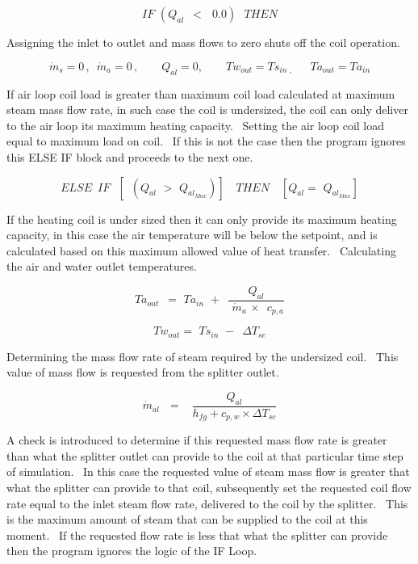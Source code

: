 \begin{equation}
IF\,\,({Q_{al}}\,\,\, < \,\,\,\,0.0)\,\,\,\,THEN
\end{equation}

Assigning the inlet to outlet and mass flows to zero shuts off the coil operation.

\begin{equation}
{\dot m_s} = 0\,,\,\,\,{\dot m_a} = 0\,,\,\,\,\,\,\,\,\,\,\,\,\,{Q_{al}} = 0,\,\,\,\,\,\,\,\,\,\,\,\,T{w_{out}} = T{s_{in\,\,,\,\,\,\,}}\,\,\,\,\,\,T{a_{out}} = T{a_{in}}
\end{equation}

If air loop coil load is greater than maximum coil load calculated at maximum steam mass flow rate, in such case the coil is undersized, the coil can only deliver to the air loop its maximum heating capacity.~ Setting the air loop coil load equal to maximum load on coil.~ If this is not the case then the program ignores this ELSE IF block and proceeds to the next one.

\begin{equation}
ELSE\,\,\,IF\,\,\,\,\left[ {\,\,\,({Q_{al}}\,\, > \,\,{Q_{a{l_{Max}}}})} \right]\,\,\,\,\,\,THEN\,\,\,\,\,\,\left[ {{Q_{al}} = \,\,{Q_{a{l_{Max}}}}} \right]
\end{equation}

If the heating coil is under sized then it can only provide its maximum heating capacity, in this case the air temperature will be below the setpoint, and is calculated based on this maximum allowed value of heat transfer.~ Calculating the air and water outlet temperatures.

\begin{equation}
T{a_{out}}\,\,\, = \,\,T{a_{in}}\,\, + \,\,\,\frac{{{Q_{al}}}}{{\,\,{{\dot m}_a}\, \times \,\,\,{c_{p,a}}}}
\end{equation}

\begin{equation}
T{w_{out}} = \,\,T{s_{in}}\,\, - \,\,\,\Delta {T_{sc}}
\end{equation}

Determining the mass flow rate of steam required by the undersized coil.~ This value of mass flow is requested from the splitter outlet.

\begin{equation}
{\dot m_{al}}\,\,\,\, = \,\,\,\,\,\frac{{{Q_{al}}}}{{{h_{fg}} + {c_{p,w}} \times \Delta {T_{sc}}}}
\end{equation}

A check is introduced to determine if this requested mass flow rate is greater than what the splitter outlet can provide to the coil at that particular time step of simulation.~ In this case the requested value of steam mass flow is greater that what the splitter can provide to that coil, subsequently set the requested coil flow rate equal to the inlet steam flow rate, delivered to the coil by the splitter.~ This is the maximum amount of steam that can be supplied to the coil at this moment.~ If the requested flow rate is less that what the splitter can provide then the program ignores the logic of the IF Loop.

